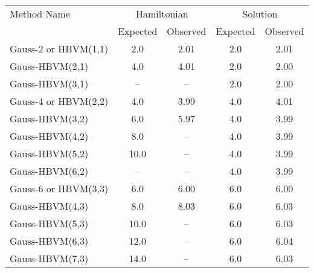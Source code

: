 \begin{tabular}{l|cccc}
\toprule
         Method Name & \multicolumn{2}{c}{Hamiltonian} & \multicolumn{2}{c}{Solution} \\
                     &    Expected & Observed & Expected & Observed \\
\midrule
Gauss-2 or HBVM(1,1) &         2.0 &     2.01 &      2.0 &     2.01 \\
     Gauss-HBVM(2,1) &         4.0 &     4.01 &      2.0 &     2.00 \\
     Gauss-HBVM(3,1) &          -- &       -- &      2.0 &     2.00 \\
Gauss-4 or HBVM(2,2) &         4.0 &     3.99 &      4.0 &     4.01 \\
     Gauss-HBVM(3,2) &         6.0 &     5.97 &      4.0 &     3.99 \\
     Gauss-HBVM(4,2) &         8.0 &       -- &      4.0 &     3.99 \\
     Gauss-HBVM(5,2) &        10.0 &       -- &      4.0 &     3.99 \\
     Gauss-HBVM(6,2) &          -- &       -- &      4.0 &     3.99 \\
Gauss-6 or HBVM(3,3) &         6.0 &     6.00 &      6.0 &     6.00 \\
     Gauss-HBVM(4,3) &         8.0 &     8.03 &      6.0 &     6.03 \\
     Gauss-HBVM(5,3) &        10.0 &       -- &      6.0 &     6.03 \\
     Gauss-HBVM(6,3) &        12.0 &       -- &      6.0 &     6.04 \\
     Gauss-HBVM(7,3) &        14.0 &       -- &      6.0 &     6.03 \\
\bottomrule
\end{tabular}
